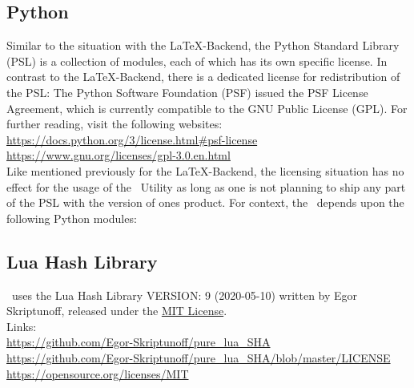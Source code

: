 		\subsection{Python}
			Similar to the situation with the \LaTeX-Backend, the Python Standard Library (PSL) is a collection of modules, each of which has its own specific
			license. In contrast to the \LaTeX-Backend, there is a dedicated license for redistribution of the PSL: The Python Software Foundation (PSF) issued 
			the PSF License Agreement, which is currently compatible to the GNU Public License (GPL). For further reading, visit the following websites:\\[0.25cm]
			\color{docartTurquoise!75}\href{https://docs.python.org/3/license.html#psf-license}{https://docs.python.org/3/license.html\#psf-license}\normalcolor\\
			\textcolor{docartTurquoise!75}{\href{https://www.gnu.org/licenses/gpl-3.0.en.html}{https://www.gnu.org/licenses/gpl-3.0.en.html}}\\[0.25cm]
			Like mentioned previously for the \LaTeX-Backend, the licensing situation has no effect for the usage of the \productName~Utility as long as one is not
			planning to ship any part of the PSL with the version of ones product.
			\newline For context, the \productName~depends upon the following Python modules:\\
			\label{sec:pythonModuleLicenses}
		
		\subsection{Lua Hash Library}
			\productName~uses the Lua Hash Library VERSION: 9 (2020-05-10) written by Egor Skriptunoff, released under the 
			\href{https://opensource.org/licenses/MIT}{MIT License}.\\[0.25cm]
			Links:\\[0.25cm]
			\color{docartTurquoise!75}\href{https://github.com/Egor-Skriptunoff/pure_lua_SHA}{https://github.com/Egor-Skriptunoff/pure\_lua\_SHA}\normalcolor\\
			\color{docartTurquoise!75}\href{https://github.com/Egor-Skriptunoff/pure_lua_SHA/blob/master/LICENSE}{https://github.com/Egor-Skriptunoff/pure\_lua\_SHA/blob/master/LICENSE}\normalcolor\\
			\textcolor{docartTurquoise!75}{\href{https://opensource.org/licenses/MIT}{https://opensource.org/licenses/MIT}}

